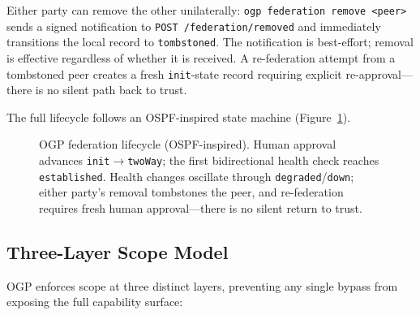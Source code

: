 \documentclass[sigconf,nonacm]{acmart}
\begin{document}
Either party can remove the other unilaterally:
\texttt{ogp federation remove <peer>} sends a signed notification to
\texttt{POST /federation/removed} and immediately transitions the
local record to \texttt{tombstoned}.
The notification is best-effort; removal is effective regardless of
whether it is received.
A re-federation attempt from a tombstoned peer creates a fresh
\texttt{init}-state record requiring explicit re-approval---there is
no silent path back to trust.

The full lifecycle follows an OSPF-inspired state machine
(Figure~\ref{fig:lifecycle}).

\begin{figure}[h]
\centering
{}
\caption{OGP federation lifecycle (OSPF-inspired). Human approval advances
\texttt{init}$\to$\texttt{twoWay}; the first bidirectional health check
reaches \texttt{established}. Health changes oscillate through
\texttt{degraded}/\texttt{down}; either party's removal tombstones the peer,
and re-federation requires fresh human approval---there is no silent return
to trust.}
\label{fig:lifecycle}
\end{figure}

\subsection{Three-Layer Scope Model}

OGP enforces scope at three distinct layers, preventing any single
bypass from exposing the full capability surface:
\end{document}
